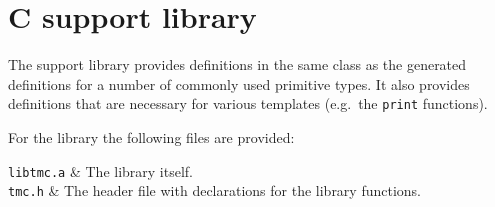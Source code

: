 \section{C support library}
\label{s.csupportlib}
The {\C} support library provides definitions in
the same class as the generated definitions for a number of commonly used
primitive types.
It also provides definitions that are necessary
for various templates (e.g.\ the {\tt print} functions).
\par
For the library the following files are provided:

\begin{desctab}
{\tt libtmc.a} & The library itself. \\
{\tt tmc.h} & The header file with declarations for the library functions. \\
\end{desctab}
